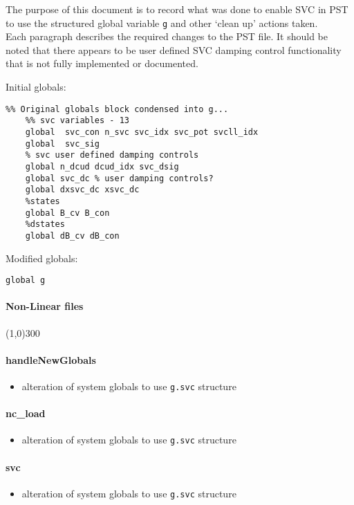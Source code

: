 \documentclass[12pt]{article}
\begin{document}
The purpose of this document is to record what was done to enable SVC in PST to use the structured global variable \verb|g| and other `clean up' actions taken. \\
Each paragraph describes the required changes to the PST file.
It should be noted that there appears to be user defined SVC damping control functionality that is not fully implemented or documented.

Initial globals:
\begin{verbatim}
%% Original globals block condensed into g...
    %% svc variables - 13
    global  svc_con n_svc svc_idx svc_pot svcll_idx
    global  svc_sig
    % svc user defined damping controls
    global n_dcud dcud_idx svc_dsig
    global svc_dc % user damping controls?
    global dxsvc_dc xsvc_dc
    %states
    global B_cv B_con
    %dstates
    global dB_cv dB_con
\end{verbatim}

Modified globals:
\begin{verbatim}
global g
\end{verbatim}
\paragraph{Non-Linear files}\line(1,0){300}
\paragraph{handleNewGlobals}
	\begin{itemize}
		\item alteration of system globals to use \verb|g.svc| structure
	\end{itemize}
	
\paragraph{nc\_load}
	\begin{itemize}
		\item alteration of system globals to use \verb|g.svc| structure
	\end{itemize}
\paragraph{svc}
	\begin{itemize}
		\item alteration of system globals to use \verb|g.svc| structure
	\end{itemize}
\end{document}
